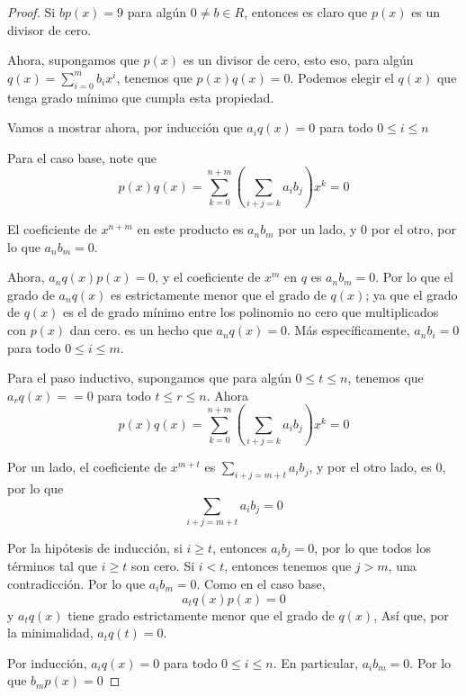 \begin{problem}[2]
\end{problem}

\begin{proof}
    Si $b p(x) = 9$ para algún $0\neq b \in R$, entonces es claro que $p(x)$ es un divisor de cero.

    Ahora, supongamos que $p(x)$ es un divisor de cero, esto eso, para algún $q(x) = \sum_{i=0}^{m} b_i x^i$, tenemos que $p(x)q(x)=0$. Podemos elegir el $q(x)$  que tenga grado mínimo que cumpla esta propiedad.

    Vamos a mostrar ahora, por inducción que $a_iq(x) = 0$ para todo $0 \leq i \leq n$

    Para el caso base, note que
    $$ p(x)q(x) = \sum_{k=0}^{n+m} \left(\sum_{i+j = k} a_ib_j\right) x^k = 0 $$
    
    El coeficiente de $x^{n+m}$ en este producto es $a_nb_m$ por un lado, y $0$ por el otro, por lo que $a_nb_m = 0$.

    Ahora, $a_nq(x)p(x) = 0$, y el coeficiente de $x^m$ en $q$ es $a_nb_m=0$. Por lo que el grado de $a_nq(x)$ es estrictamente menor que el grado de $q(x)$; ya que el grado de $q(x)$ es el de grado mínimo entre los polinomio no cero que multiplicados con $p(x)$ dan cero. es un hecho que $a_nq(x) = 0$. Más específicamente, $a_nb_i = 0$ para todo $0 \leq i \leq m$.

    Para el paso inductivo, supongamos que para algún $0 \leq t \leq n$, tenemos que $a_rq(x) == 0$ para todo $t \leq r \leq n$. Ahora
    $$ p(x)q(x) = \sum_{k=0}^{n+m} \left( \sum_{i+j=k} a_ib_j\right) x^k = 0 $$
    
    Por un lado, el coeficiente de $x^{m+t}$ es $\sum_{i+j=m+t}a_ib_j$, y por el otro lado, es $0$, por lo que 
    $$ \sum_{i+j=m+t} a_ib_j = 0$$

    Por la hipótesis de inducción, si $i \geq t$, entonces $a_ib_j = 0$, por lo que todos los términos tal que $i \geq t$ son cero. Si $i<t$, entonces tenemos que $j>m$, una contradicción. Por lo que $a_ib_m = 0$. Como en el caso base, 
    $$ a_tq(x)p(x) = 0$$
    y $a_tq(x)$ tiene grado estrictamente menor que el grado de $q(x)$, Así que, por la minimalidad, $a_tq(t)=0$.

    Por inducción, $a_iq(x) = 0$ para todo $0 \leq i \leq n$. En particular, $a_ib_m =0$. Por lo que $b_mp(x) = 0$
\end{proof}